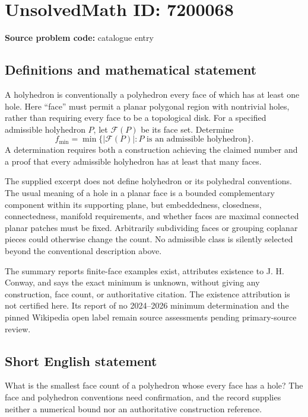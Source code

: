 \documentclass[11pt]{article}
\begin{document}
\section*{UnsolvedMath ID: 7200068}
\textbf{Source problem code:} catalogue entry
\subsection{Definitions and mathematical statement}
A holyhedron is conventionally a polyhedron every face of which has at least one hole. Here ``face'' must permit a planar polygonal region with nontrivial holes, rather than requiring every face to be a topological disk. For a specified admissible holyhedron \(P\), let \(\mathcal F(P)\) be its face set. Determine
\[
 f_{\min}=\min\{|\mathcal F(P)|:P\text{ is an admissible holyhedron}\}.
\]
A determination requires both a construction achieving the claimed number and a proof that every admissible holyhedron has at least that many faces.

The supplied excerpt does not define holyhedron or its polyhedral conventions. The usual meaning of a hole in a planar face is a bounded complementary component within its supporting plane, but embeddedness, closedness, connectedness, manifold requirements, and whether faces are maximal connected planar patches must be fixed. Arbitrarily subdividing faces or grouping coplanar pieces could otherwise change the count. No admissible class is silently selected beyond the conventional description above.

The summary reports finite-face examples exist, attributes existence to J. H. Conway, and says the exact minimum is unknown, without giving any construction, face count, or authoritative citation. The existence attribution is not certified here. Its report of no 2024--2026 minimum determination and the pinned Wikipedia open label remain source assessments pending primary-source review.
\subsection{Short English statement}
What is the smallest face count of a polyhedron whose every face has a hole? The face and polyhedron conventions need confirmation, and the record supplies neither a numerical bound nor an authoritative construction reference.
\end{document}
